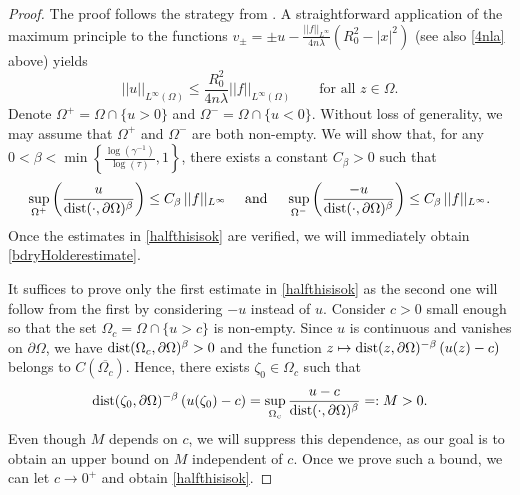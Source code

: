 \documentclass[12pt]{amsart}
\def \O {\Omega}
\begin{document}
\begin{proof}
The proof follows the strategy from \cite[Theorem 3.5]{ChoSafonov}. A straightforward application of the maximum principle to the functions $v_{\pm}=\pm u-\frac{||f||_{L^{\infty}}}{4n\lambda}\left(R^2_0-|x|^2\right)$ (see also \eqref{4nla} above) yields
\begin{equation}\label{inftoinf}
||u||_{L^{\infty}(\O)}\leq \frac{R_0^2}{4n\lambda}||f||_{L^{\infty}(\O)}\qquad\mbox{for all }z\in\O.
\end{equation}
Denote $\O^+=\O\cap\{u>0\}$ and $\O^-=\O\cap\{u<0\}$. Without loss of generality, we may assume that $\O^+$ and $\O^-$ are both non-empty. We will show that, for any $0<\beta<\min\left\{\frac{\log(\gamma^{-1})}{\log(\tau)},1\right\}$, there exists a constant $C_\beta > 0$ such that
\begin{equation}\label{halfthisisok}
\sup_{\O^+} \left(\frac{u}{{\rm{dist}}(\cdot, \partial\O)^{\beta}}\right) \leq C_\beta\, ||f||_{L^{\infty}}\quad\mbox{ and }\quad \sup_{\O^-} \left(\frac{-u}{{\rm{dist}}(\cdot, \partial\O)^{\beta}}\right) \leq C_\beta\, ||f||_{L^{\infty}}.
\end{equation} 
Once the estimates in \eqref{halfthisisok} are verified, we will immediately obtain \eqref{bdryHolderestimate}.

It suffices to prove only the first estimate in \eqref{halfthisisok} as the second one will follow from the first by considering $-u$ instead of $u$. Consider $c>0$ small enough so that the set $\O_c=\O\cap\{u>c\}$ is non-empty. Since $u$ is continuous and vanishes on $\partial\O$, we have ${\rm{dist}}(\O_c, \partial\O)^{\beta}>0$ and the function $ z\mapsto {\rm{dist}}(z, \partial\O)^{-\beta} \left(u(z) - c\right)$ belongs to $C\left(\overline{\O_c}\right)$. Hence, there exists $\zeta_0\in \O_c$ such that
$$
{\rm{dist}}(\zeta_0, \partial\O)^{-\beta} \left(u(\zeta_0) - c\right)=\sup_{\O_c}\frac{u-c}{{\rm{dist}}(\cdot, \partial\O)^{\beta}} =:M>0.
$$
Even though $M$ depends on $c$, we will suppress this dependence, as our goal is to obtain an upper bound on $M$ independent of $c$. Once we prove such a bound, we can let $c \to 0^+$ and obtain \eqref{halfthisisok}.


\end{proof}
\end{document}
